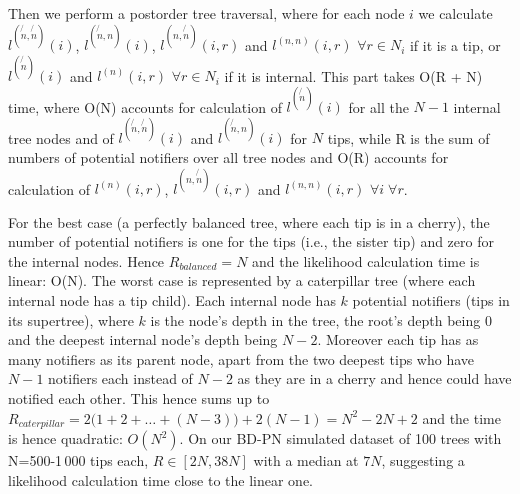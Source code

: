 \documentclass[10pt,letterpaper]{article}
\begin{document}
 Then we perform a postorder tree traversal, where for each node $i$ we calculate $l^{(\not{n}, \not{n})}(i)$, $l^{(\not{n}, n)}(i)$, $l^{(n, \not{n})}(i, r)$ and $l^{(n, n)}(i, r)$ $\forall r \in N_i$ if it is a tip, or $l^{(\not{n})}(i)$ and $l^{(n)}(i, r)$ $\forall r \in N_i$ if it is internal.
This part takes O(R + N) time, where O(N) accounts for calculation of $l^{(\not{n})}(i)$ for all the $N - 1$ internal tree nodes and of $l^{(\not{n}, \not{n})}(i)$ and $l^{(\not{n}, n)}(i)$ for $N$ tips, while R is the sum of numbers of potential notifiers over all tree nodes and O(R) accounts for calculation of $l^{(n)}(i, r)$, $l^{(n, \not{n})}(i, r)$ and $l^{(n, n)}(i, r)$ $\forall i\; \forall r$. 

For the best case (a perfectly balanced tree, where each tip is in a cherry), the number of potential notifiers is one for the tips (i.e., the sister tip) and zero for the internal nodes. Hence $R_{balanced} = N$ and the likelihood calculation time is linear: O(N). The worst case  is represented by a caterpillar tree (where each internal node has a tip child). Each internal node has $k$ potential notifiers (tips in its supertree), where $k$ is the node's depth in the tree, the root's depth being 0 and the deepest internal node's depth being $N-2$. Moreover each tip has as many notifiers as its parent node, apart from the two deepest tips who have $N-1$ notifiers each instead of $N-2$ as they are in a cherry and hence could have notified each other. This hence sums up to $R_{caterpillar} = 2\big(1 + 2 + \ldots + (N-3)\big) + 2(N-1) = N^2 - 2N + 2$ and the time is hence quadratic: $O(N^2)$. On our BD-PN simulated dataset of 100 trees with N=500-1\,000 tips each, $R \in [2N, 38N]$ with a median at $7N$, suggesting a likelihood calculation time close to the linear one.
\end{document}
